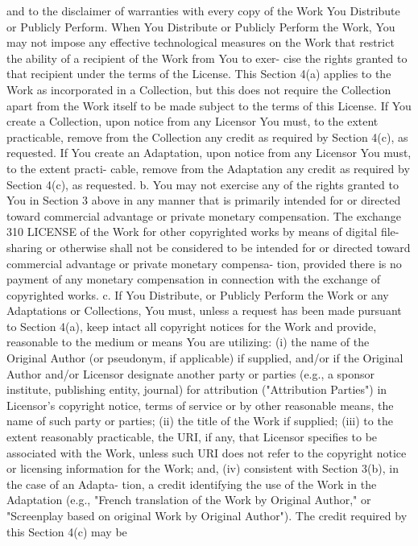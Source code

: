 \documentclass[oneside]{book}
\begin{document}
and to the disclaimer of warranties with every copy of the Work You Distribute
or Publicly Perform. When You Distribute or Publicly Perform the Work, You may
not impose any effective technological measures on the Work that restrict the
ability of a recipient of the Work from You to exer- cise the rights granted to
that recipient under the terms of the License. This Section 4(a) applies to the
Work as incorporated in a Collection, but this does not require the Collection
apart from the Work itself to be made subject to the terms of this License. If
You create a Collection, upon notice from any Licensor You must, to the extent
practicable, remove from the Collection any credit as required by Section 4(c),
as requested. If You create an Adaptation, upon notice from any Licensor You
must, to the extent practi- cable, remove from the Adaptation any credit as
required by Section 4(c), as requested.  b. You may not exercise any of the
rights granted to You in Section 3 above in any manner that is primarily
intended for or directed toward commercial advantage or private monetary
compensation. The exchange 310 LICENSE of the Work for other copyrighted works
by means of digital file-sharing or otherwise shall not be considered to be
intended for or directed toward commercial advantage or private monetary
compensa- tion, provided there is no payment of any monetary compensation in
connection with the exchange of copyrighted works.  c. If You Distribute, or
Publicly Perform the Work or any Adaptations or Collections, You must, unless a
request has been made pursuant to Section 4(a), keep intact all copyright
notices for the Work and provide, reasonable to the medium or means You are
utilizing: (i) the name of the Original Author (or pseudonym, if applicable) if
supplied, and/or if the Original Author and/or Licensor designate another party
or parties (e.g., a sponsor institute, publishing entity, journal) for
attribution ("Attribution Parties") in Licensor's copyright notice, terms of
service or by other reasonable means, the name of such party or parties; (ii)
the title of the Work if supplied; (iii) to the extent reasonably practicable,
the URI, if any, that Licensor specifies to be associated with the Work, unless
such URI does not refer to the copyright notice or licensing information for the
Work; and, (iv) consistent with Section 3(b), in the case of an Adapta- tion, a
credit identifying the use of the Work in the Adaptation (e.g., "French
translation of the Work by Original Author," or "Screenplay based on original
Work by Original Author"). The credit required by this Section 4(c) may be
\end{document}
